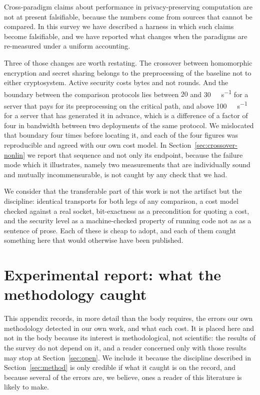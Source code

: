 \documentclass[11pt]{article}
\begin{document}
Cross-paradigm claims about performance in privacy-preserving computation are not at present
falsifiable, because the numbers come from sources that cannot be compared. In this survey we have
described a harness in which such claims become falsifiable, and we have reported what changes when
the paradigms are re-measured under a uniform accounting.

Three of those changes are worth restating. The crossover between homomorphic encryption and secret
sharing belongs to the preprocessing of the baseline not to either cryptosystem. Active
security costs bytes and not rounds. And the boundary between the comparison protocols lies between
$20$ and \SI{30}{\mega\bit\per\second} for a server that pays for its preprocessing on the critical
path, and above \SI{100}{\mega\bit\per\second} for a server that has generated it in advance, which
is a difference of a factor of four in bandwidth between two deployments of the same protocol. We
mislocated that boundary four times before locating it, and each of the four figures was
reproducible and agreed with our own cost model. In Section~\ref{sec:crossover-nonlin} we report
that sequence and not only its endpoint, because the failure mode which it illustrates, namely two
measurements that are individually sound and mutually incommensurable, is not caught by any check
that we had.

We consider that the transferable part of this work is not the artifact but the discipline:
identical transports for both legs of any comparison, a cost model checked against a real socket,
bit-exactness as a precondition for quoting a cost, and the security level as a machine-checked
property of running code not as as a sentence of prose. Each of these is cheap to adopt, and
each of them caught something here that would otherwise have been published.

\appendix

\section{Experimental report: what the methodology caught}
\label{sec:appendix:caught}

This appendix records, in more detail than the body requires, the errors our own
methodology detected in our own work, and what each cost. It is placed here and not in the body because its interest is methodological, not scientific: the
results of the survey do not depend on it, and a reader concerned only with those
results may stop at Section~\ref{sec:open}. We include it because the discipline
described in Section~\ref{sec:method} is only credible if what it caught is on the
record, and because several of the errors are, we believe, ones a reader of this
literature is likely to make.
\end{document}
